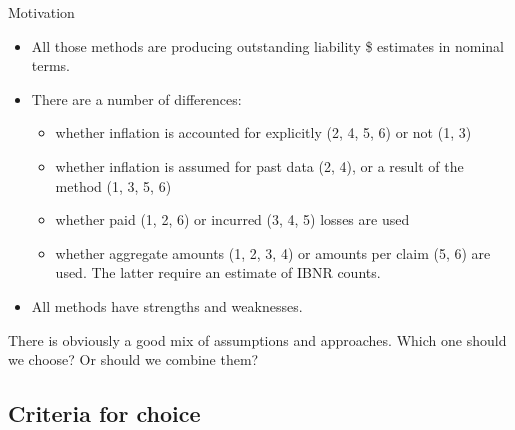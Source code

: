 \documentclass[
  ignorenonframetext,
  t,handout]{beamer}
\providecommand{\tightlist}{%
  \setlength{\itemsep}{0pt}\setlength{\parskip}{0pt}}
\begin{document}
\begin{frame}{Motivation}
\begin{itemize}
\tightlist
\item
  All those methods are producing outstanding liability \$ estimates in
  nominal terms.
\item
  There are a number of differences:

  \begin{itemize}
  \tightlist
  \item
    whether inflation is accounted for explicitly (2, 4, 5, 6) or not
    (1, 3)
  \item
    whether inflation is assumed for past data (2, 4), or a result of
    the method (1, 3, 5, 6)
  \item
    whether paid (1, 2, 6) or incurred (3, 4, 5) losses are used
  \item
    whether aggregate amounts (1, 2, 3, 4) or amounts per claim (5, 6)
    are used. The latter require an estimate of IBNR counts.
  \end{itemize}
\item
  All methods have strengths and weaknesses.
\end{itemize}

There is obviously a good mix of assumptions and approaches. Which one
should we choose? Or should we combine them?
\end{frame}

\subsection{Criteria for choice}\label{criteria-for-choice}
\end{document}
